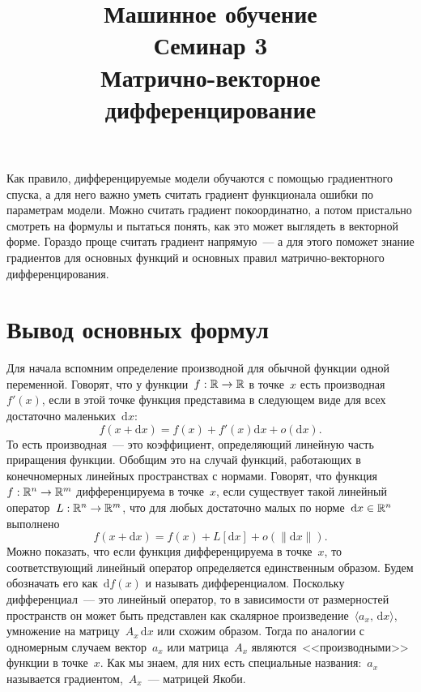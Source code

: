 \documentclass[12pt,fleqn]{article}
\newcommand{\dx}[1]{\,\mathrm{d}#1} %
\begin{document}
\title{Машинное обучение\\Семинар 3\\Матрично-векторное дифференцирование}
\author{}
\date{}
\maketitle

Как правило, дифференцируемые модели обучаются с помощью градиентного спуска, а для него важно уметь считать градиент функционала ошибки по параметрам модели. Можно считать градиент покоординатно, а потом пристально смотреть на формулы и пытаться понять, как это может выглядеть в векторной форме. Гораздо проще считать градиент напрямую~--- а для этого поможет знание градиентов для основных функций и основных правил матрично-векторного дифференцирования.

\section{Вывод основных формул}

Для начала вспомним определение производной для обычной функции одной переменной.
Говорят, что у функции~$f: \mathbb{R} \to \mathbb{R}$ в точке~$x$ есть производная~$f'(x)$,
если в этой точке функция представима в следующем виде для всех достаточно маленьких~$\mathrm{d}x$:
\[
    f(x + \mathrm{d}x)
    =
    f(x)
    +
    f'(x) \mathrm{d}x
    +
    o(\mathrm{d}x).
\]
То есть производная~--- это коэффициент, определяющий линейную часть приращения функции.
Обобщим это на случай функций, работающих в конечномерных линейных пространствах с нормами.
Говорят, что функция~$f: \mathbb{R}^n \to \mathbb{R}^m$ дифференцируема в точке~$x$,
если существует такой линейный оператор~$L: \mathbb{R}^n \to \mathbb{R}^m$, что для любых достаточно
малых по норме~$\mathrm{d}x \in \mathbb{R}^n$ выполнено
\[
    f(x + \mathrm{d}x)
    =
    f(x)
    +
    L[\mathrm{d}x]
    +
    o(\|\mathrm{d}x\|).
\]
Можно показать, что если функция дифференцируема в точке~$x$,
то соответствующий линейный оператор определяется единственным образом.
Будем обозначать его как~$\mathrm{d}f(x)$ и называть дифференциалом.
Поскольку дифференциал~--- это линейный оператор, то в зависимости от размерностей
пространств он может быть представлен как скалярное произведение~$\langle a_x, \dx{x} \rangle$,
умножение на матрицу~$A_x \dx{x}$ или схожим образом.
Тогда по аналогии с одномерным случаем вектор~$a_x$ или матрица~$A_x$ являются~<<производными>>
функции в точке~$x$.
Как мы знаем, для них есть специальные названия:~$a_x$ называется градиентом,~$A_x$~--- матрицей Якоби.
\end{document}
